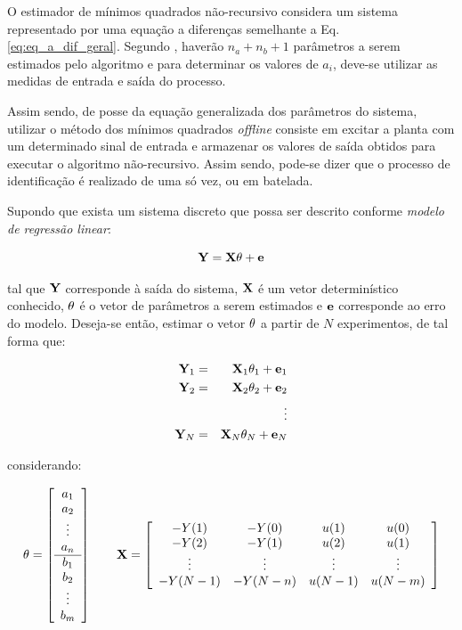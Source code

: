 O estimador de mínimos quadrados não-recursivo considera um sistema representado
por uma equação a diferenças semelhante a Eq. \ref{eq:eq_a_dif_geral}. Segundo
, haverão $n_a + n_b + 1$ parâmetros a serem estimados
pelo algoritmo e para determinar os valores de $a_i$, deve-se utilizar as
medidas de entrada e saída do processo.

Assim sendo, de posse da equação generalizada dos parâmetros do sistema,
utilizar o método dos mínimos quadrados {\it offline} consiste em excitar a
planta com um determinado sinal de entrada e armazenar os valores de saída
obtidos para executar o algoritmo não-recursivo. Assim sendo, pode-se dizer que
o processo de identificação é realizado de uma só vez, ou em batelada.

Supondo que exista um sistema discreto que possa ser descrito conforme {\it
modelo de regressão linear}:

\begin{equation}\label{eq:mode_reg_lin}
\mathbf{Y} = \mathbf{X\theta} + \mathbf{e}
\end{equation}

\noindent tal que $\mathbf{Y}$ corresponde à saída do sistema, $\mathbf{X}$ é um vetor
determinístico conhecido, $\mathbf{\theta}$ é o vetor de parâmetros a serem
estimados e $\mathbf{e}$ corresponde ao erro do modelo. Deseja-se então, estimar o
vetor $\mathbf{\theta}$ a partir de $N$ experimentos, de tal forma que:

\begin{eqnarray}
\mathbf{Y}_1 & = & \mathbf{X}_1\mathbf{\theta}_1 + \mathbf{e}_1\nonumber\\
\mathbf{Y}_2 & = & \mathbf{X}_2\mathbf{\theta}_2 + \mathbf{e}_2\nonumber\\
& & \vdots\nonumber\\ 
\mathbf{Y}_N & = & \mathbf{X}_N\mathbf{\theta}_N + \mathbf{e}_N\nonumber
\end{eqnarray}

\noindent considerando:

\begin{equation*}
\mathbf{\theta} = \left[
\begin{array}{c}
a_1\\
a_2\\
\vdots\\
a_n\\
\hline
b_1\\
b_2\\
\vdots\\
b_m
\end{array}
\right] \qquad
\mathbf{X} = \left[
\begin{array}{cccc}
-Y(1) & -Y(0) & u(1) & u(0)\\
-Y(2) & -Y(1) & u(2) & u(1)\\
\vdots & \vdots & \vdots & \vdots\\
-Y(N-1) & -Y(N-n) & u(N-1) & u(N-m)
\end{array}
\right]
\end{equation*}

